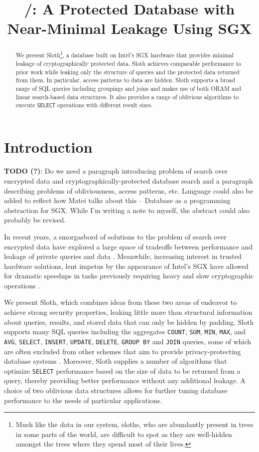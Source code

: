 \documentclass[USenglish,oneside,twocolumn]{article}
\author{}
\title{\textbf{\name/: A Protected Database with Near-Minimal Leakage Using SGX}}
\def\name/{Sloth}
\begin{document}
\maketitle
  \begin{abstract}
{We present \name/\footnote{Much like the data in our system, sloths, who are abundantly present in trees in some parts of the world, are difficult to spot as they are well-hidden amongst the trees where they spend most of their lives.}, a database built on Intel's SGX hardware that provides minimal leakage of cryptographically protected data. \name/ achieves comparable performance to prior work while leaking only the structure of queries and the protected data returned from them. In particular, access patterns to data are hidden. \name/ supports a broad range of SQL queries including groupings and joins and makes use of both ORAM and linear search-based data structures. It also provides a range of oblivious algorithms to execute \texttt{SELECT} operations with different result sizes. 
}
\end{abstract} 

\section{Introduction}
\textbf{TODO (?)}: Do we need a paragraph introducing problem of search over encrypted data and cryptographically-protected database search and a paragraph describing problems of obliviousness, access patterns, etc. Language could also be added to reflect how Matei talks about this -- Database as a programming abstraction for SGX. While I'm writing a note to myself, the abstract could also probably be revised. 

In recent years, a smorgasbord of solutions to the problem of search over encrypted data have explored a large space of tradeoffs between performance and leakage of private queries and data \cite{FVY+17}. Meanwhile, increasing interest in trusted hardware solutions, lent impetus by the appearance of Intel's SGX \cite{CD16} have allowed for dramatic speedups in tasks previously requiring heavy and slow cryptographic operations \cite{FVBG16, NFR+17}. 

We present \name/, which combines ideas from these two areas of endeavor to achieve strong security properties, leaking little more than structural information about queries, results, and stored data that can only be hidden by padding. \name/ supports many SQL queries including the aggregates \texttt{COUNT}, \texttt{SUM}, \texttt{MIN}, \texttt{MAX}, and \texttt{AVG}, \texttt{SELECT}, \texttt{INSERT}, \texttt{UPDATE}, \texttt{DELETE}, \texttt{GROUP BY} and \texttt{JOIN} queries, some of which are often excluded from other schemes that aim to provide privacy-protecting database systems \cite{FVY+17}. Moreover, \name/ supplies a number of algorithms that optimize \texttt{SELECT} performance based on the size of data to be returned from a query, thereby providing better performance without any additional leakage. A choice of two oblivious data structures allows for further tuning database performance to the needs of particular applications. 
\end{document}
